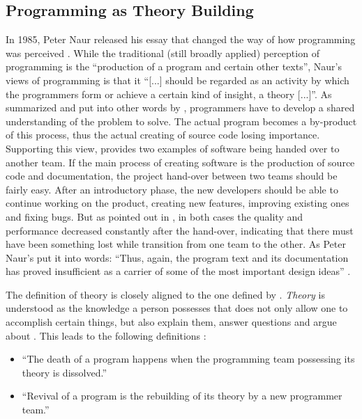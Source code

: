 \subsection{Programming as Theory Building}
\label{sub:programming-as-theory-building}
In 1985, Peter Naur released his essay  that changed the way of how programming was perceived \autocite{naur_programming_1985}.
While the traditional (still broadly applied) perception of programming is the ``production of a program and certain other texts'', Naur's views of programming is that it ``[...] should be regarded as an activity by which the programmers form or achieve a certain kind of insight, a theory [...]''.
As summarized and put into other words by \textcite{aranda_naurs_2011}, programmers have to develop a shared understanding of the problem to solve.
The actual program becomes a by-product of this process, thus the actual creating of source code losing importance.
Supporting this view, \citeauthor{naur_programming_1985} provides two examples of software being handed over to another team.
If the main process of creating software is the production of source code and documentation, the project hand-over between two teams should be fairly easy.
After an introductory phase, the new developers should be able to continue working on the product, creating new features, improving existing ones and fixing bugs.
But as pointed out in \textcite[228--229]{naur_programming_1985}, in both cases the quality and performance decreased constantly after the hand-over, indicating that there must have been something lost while transition from one team to the other.
As Peter Naur's put it into words: ``Thus, again, the program text and its documentation has proved insufficient as a carrier of some of the most important design ideas'' \autocite[229]{naur_programming_1985}.

The definition of theory is closely aligned to the one defined by \textcite{ryle_concept_1984}.
\emph{Theory} is understood as the knowledge a person possesses that does not only allow one to accomplish certain things, but also explain them, answer questions and argue about \autocite{naur_programming_1985}.
This leads to the following definitions \autocite[234]{naur_programming_1985}:
\begin{itemize}
    \item ``The death of a program happens when the programming team possessing its theory is dissolved.''
    \item ``Revival of a program is the rebuilding of its theory by a new programmer team.''
\end{itemize}

